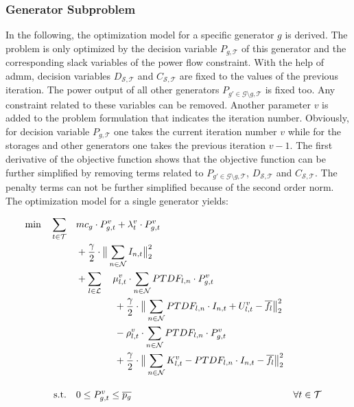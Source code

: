 \subsubsection*{Generator Subproblem}

In the following, the optimization model for a specific generator $g$ is derived. The problem is only optimized by the decision variable $P_{g,\mathcal{T}}$ of this generator and the corresponding slack variables of the power flow constraint. With the help of \gls{admm}, decision variables $D_{\mathcal{S},\mathcal{T}}$ and $C_{\mathcal{S},\mathcal{T}}$ are fixed to the values of the previous iteration. The power output of all other generators $P_{g' \in \mathcal{G}\setminus g,\mathcal{T}}$ is fixed too. Any constraint related to these variables can be removed. Another parameter $v$ is added to the problem formulation that indicates the iteration number. Obviously, for decision variable $P_{g,\mathcal{T}}$ one takes the current iteration number $v$ while for the storages and other generators one takes the previous iteration $v-1$. The first derivative of the objective function shows that the objective function can be further simplified by removing terms related to $P_{g' \in \mathcal{G}\setminus g,\mathcal{T}}$, $D_{\mathcal{S},\mathcal{T}}$ and $C_{\mathcal{S},\mathcal{T}}$. The penalty terms can not be further simplified because of the second order norm. The optimization model for a single generator yields:

\begin{subequations}
	\begin{align}
		 \min \quad \sum_{t\in\mathcal{T}} \quad & mc_g \cdot P_{g,t}^v + \lambda_t^v \cdot P_{g,t}^v \label{eq:sub:gen}\\
		 & + \frac{\gamma}{2} \cdot \big\| \sum_{n \in \mathcal{N}} I_{n,t} \big\|^2_2 \nonumber \\
		 & + \sum_{l \in \mathcal{L}} \quad \mu_{l,t}^v \cdot \sum_{n \in \mathcal{N}} PTDF_{l,n} \cdot P_{g,t}^v \nonumber \\
		 & \qquad \qquad + \frac{\gamma}{2} \cdot \big\| \sum_{n \in \mathcal{N}} PTDF_{l,n} \cdot I_{n,t} + U_{l,t}^v - \overline{f_l} \big\|^2_2 \nonumber \\
		 & \qquad \qquad - \rho_{l,t}^v \cdot \sum_{n \in \mathcal{N}} PTDF_{l,n} \cdot P_{g,t}^v \nonumber \\
		 & \qquad \qquad + \frac{\gamma}{2} \cdot \big\| \sum_{n \in \mathcal{N}} K_{l,t}^v - PTDF_{l,n} \cdot I_{n,t} - \overline{f_l} \big\|^2_2 \nonumber \\[10pt]
		 \text{s.t.} \quad & 0 \leq P_{g,t}^v \leq \overline{p_g} && \forall t \in \mathcal{T}
	\end{align}
\end{subequations}

